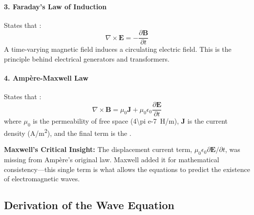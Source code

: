 \paragraph{3. Faraday's Law of Induction}
States that :
\begin{equation}
    \nabla \times \mathbf{E} = -\frac{\partial \mathbf{B}}{\partial t}
    \label{eq:faraday}
\end{equation}
 A time-varying magnetic field induces a circulating electric field. This is the principle behind electrical generators and transformers.

\paragraph{4. Ampère-Maxwell Law}
States that :
\begin{equation}
    \nabla \times \mathbf{B} = \mu_0 \mathbf{J} + \mu_0 \epsilon_0 \frac{\partial \mathbf{E}}{\partial t}
    \label{eq:ampere-maxwell}
\end{equation}
where $\mu_0$ is the permeability of free space (\SI{4\pi e-7}{H/m}), $\mathbf{J}$ is the current density (\unit{A/m^2}), and the final term is the .

\begin{keyconcept}
    \textbf{Maxwell's Critical Insight:} The displacement current term, $\mu_0 \epsilon_0 \partial \mathbf{E}/\partial t$, was missing from Ampère's original law. Maxwell added it for mathematical consistency—this single term is what allows the equations to predict the existence of electromagnetic waves.
\end{keyconcept}

\subsection{Derivation of the Wave Equation}

